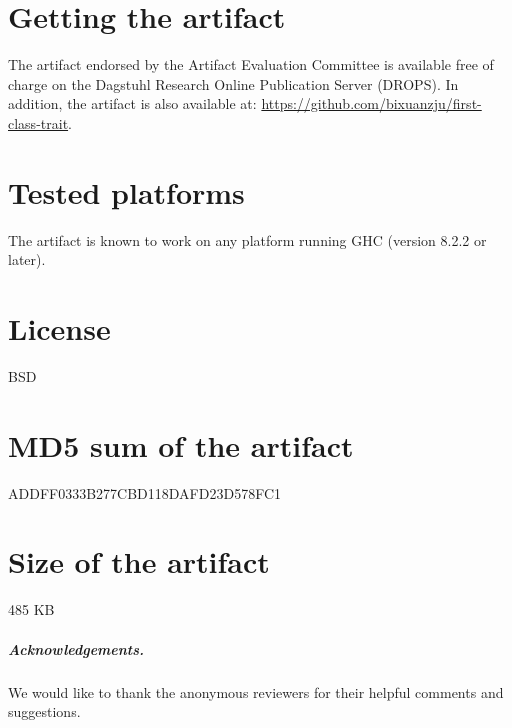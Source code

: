 \documentclass[a4paper,UKenglish]{darts-v2018}
\newenvironment{getting}{\section{Getting the artifact} The artifact 
endorsed by the Artifact Evaluation Committee is available free of 
charge on the Dagstuhl Research Online Publication Server (DROPS).}{}
\newenvironment{platforms}{\section{Tested platforms}}{}
\newcommand{\license}[1]{{\section{License}#1}}
\newcommand{\mdsum}[1]{{\section{MD5 sum of the artifact}#1}}
\newcommand{\artifactsize}[1]{{\section{Size of the artifact}#1}}
\begin{document}
\begin{getting}
In addition, the artifact is also available at:
\url{https://github.com/bixuanzju/first-class-trait}.
\end{getting}

\begin{platforms}
  The artifact is known to work on any platform running GHC (version 8.2.2 or later).
\end{platforms}

\license{BSD}

\mdsum{ADDFF0333B277CBD118DAFD23D578FC1}

\artifactsize{485 KB}

\subparagraph*{Acknowledgements.}

We would like to thank the anonymous reviewers for their helpful comments
and suggestions.







% 

\end{document}

